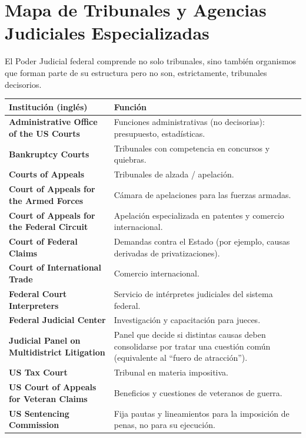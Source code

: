 \documentclass[12pt,oneside]{book}
\begin{document}
\section{Mapa de Tribunales y Agencias Judiciales Especializadas}

El Poder Judicial federal comprende no solo tribunales, sino también organismos que forman parte de su estructura pero no son, estrictamente, tribunales decisorios.

\begin{table}[H]
\centering
\begin{tabularx}{\textwidth}{p{4cm} X}
\toprule
\textbf{Institución (inglés)} & \textbf{Función} \\
\midrule
\textbf{Administrative Office of the US Courts} & Funciones administrativas (no decisorias): presupuesto, estadísticas. \\
\midrule
\textbf{Bankruptcy Courts} & Tribunales con competencia en concursos y quiebras. \\
\midrule
\textbf{Courts of Appeals} & Tribunales de alzada / apelación. \\
\midrule
\textbf{Court of Appeals for the Armed Forces} & Cámara de apelaciones para las fuerzas armadas. \\
\midrule
\textbf{Court of Appeals for the Federal Circuit} & Apelación especializada en patentes y comercio internacional. \\
\midrule
\textbf{Court of Federal Claims} & Demandas contra el Estado (por ejemplo, causas derivadas de privatizaciones). \\
\midrule
\textbf{Court of International Trade} & Comercio internacional. \\
\midrule
\textbf{Federal Court Interpreters} & Servicio de intérpretes judiciales del sistema federal. \\
\midrule
\textbf{Federal Judicial Center} & Investigación y capacitación para jueces. \\
\midrule
\textbf{Judicial Panel on Multidistrict Litigation} & Panel que decide si distintas causas deben consolidarse por tratar una cuestión común (equivalente al ``fuero de atracción''). \\
\midrule
\textbf{US Tax Court} & Tribunal en materia impositiva. \\
\midrule
\textbf{US Court of Appeals for Veteran Claims} & Beneficios y cuestiones de veteranos de guerra. \\
\midrule
\textbf{US Sentencing Commission} & Fija pautas y lineamientos para la imposición de penas, no para su ejecución. \\
\bottomrule
\end{tabularx}
\end{table}
\end{document}
